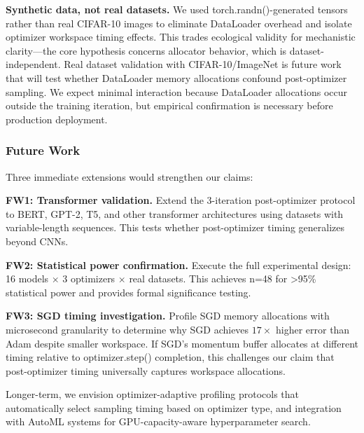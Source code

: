 \textbf{Synthetic data, not real datasets.} We used torch.randn()-generated tensors rather than real CIFAR-10 images to eliminate DataLoader overhead and isolate optimizer workspace timing effects. This trades ecological validity for mechanistic clarity---the core hypothesis concerns allocator behavior, which is dataset-independent. Real dataset validation with CIFAR-10/ImageNet is future work that will test whether DataLoader memory allocations confound post-optimizer sampling. We expect minimal interaction because DataLoader allocations occur outside the training iteration, but empirical confirmation is necessary before production deployment.

\subsubsection{Future Work}

Three immediate extensions would strengthen our claims:

\textbf{FW1: Transformer validation.} Extend the 3-iteration post-optimizer protocol to BERT, GPT-2, T5, and other transformer architectures using datasets with variable-length sequences. This tests whether post-optimizer timing generalizes beyond CNNs.

\textbf{FW2: Statistical power confirmation.} Execute the full experimental design: 16 models $\times$ 3 optimizers $\times$ real datasets. This achieves n=48 for >95\% statistical power and provides formal significance testing.

\textbf{FW3: SGD timing investigation.} Profile SGD memory allocations with microsecond granularity to determine why SGD achieves $17\times$ higher error than Adam despite smaller workspace. If SGD's momentum buffer allocates at different timing relative to optimizer.step() completion, this challenges our claim that post-optimizer timing universally captures workspace allocations.

Longer-term, we envision optimizer-adaptive profiling protocols that automatically select sampling timing based on optimizer type, and integration with AutoML systems for GPU-capacity-aware hyperparameter search.


